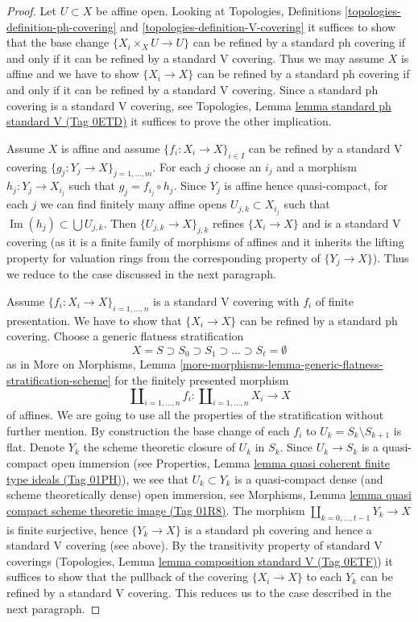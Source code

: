 \documentclass{amsart}
\theoremstyle{plain}
\theoremstyle{definition}
\theoremstyle{remark}
\numberwithin{equation}{subsection}
\def\Im{\mathop{\mathrm{Im}}}
\begin{document}
\begin{proof}
Let $U \subset X$ be affine open. Looking at
Topologies, Definitions \ref{topologies-definition-ph-covering}
and \ref{topologies-definition-V-covering} it suffices to show that
the base change $\{X_i \times_X U \to U\}$ can be refined
by a standard ph covering if and only if it can be refined by
a standard V covering. Thus we may assume $X$ is affine and we have to show
$\{X_i \to X\}$ can be refined by a standard ph covering
if and only if it can be refined by a standard V covering.
Since a standard ph covering is a standard V covering, see
Topologies, Lemma \href{https://stacks.math.columbia.edu/tag/0ETD}{lemma standard ph standard V (Tag 0ETD)}
it suffices to prove the other implication.

\medskip\noindent
Assume $X$ is affine and assume $\{f_i : X_i \to X\}_{i \in I}$
can be refined by a standard V covering
$\{g_j : Y_j \to X\}_{j = 1, \ldots, m}$.
For each $j$ choose an $i_j$ and a morphism
$h_j : Y_j \to X_{i_j}$ such that $g_j = f_{i_j} \circ h_j$.
Since $Y_j$ is affine hence quasi-compact,
for each $j$ we can find finitely many affine opens
$U_{j, k} \subset X_{i_j}$ such that $\Im(h_j) \subset \bigcup U_{j, k}$.
Then $\{U_{j, k} \to X\}_{j, k}$ refines $\{X_i \to X\}$
and is a standard V covering (as it is a finite family of morphisms
of affines and it inherits the lifting property for valuation rings
from the corresponding property of $\{Y_j \to X\}$).
Thus we reduce to the case discussed in the next paragraph.

\medskip\noindent
Assume $\{f_i : X_i \to X\}_{i = 1, \ldots, n}$
is a standard V covering with $f_i$ of finite presentation.
We have to show that $\{X_i \to X\}$ can be refined by a standard ph covering.
Choose a generic flatness stratification
$$
X = S \supset S_0 \supset S_1 \supset \ldots \supset S_t = \emptyset
$$
as in More on Morphisms, Lemma
\ref{more-morphisms-lemma-generic-flatness-stratification-scheme}
for the finitely presented morphism
$$
\coprod\nolimits_{i = 1, \ldots, n} f_i :
\coprod\nolimits_{i = 1, \ldots, n} X_i
\longrightarrow
X
$$
of affines. We are going to use all the properties of the stratification
without further mention. By construction the base change of each $f_i$ to
$U_k = S_k \setminus S_{k + 1}$ is flat.
Denote $Y_k$ the scheme theoretic closure of $U_k$ in $S_k$. Since
$U_k \to S_k$ is a quasi-compact open immersion (see
Properties, Lemma \href{https://stacks.math.columbia.edu/tag/01PH}{lemma quasi coherent finite type ideals (Tag 01PH)}),
we see that $U_k \subset Y_k$ is a quasi-compact dense
(and scheme theoretically dense) open immersion, see
Morphisms, Lemma \href{https://stacks.math.columbia.edu/tag/01R8}{lemma quasi compact scheme theoretic image (Tag 01R8)}.
The morphism $\coprod_{k = 0, \ldots, t - 1} Y_k \to X$
is finite surjective, hence $\{Y_k \to X\}$ is a standard ph covering
and hence a standard V covering (see above). By the transitivity
property of standard V coverings
(Topologies, Lemma \href{https://stacks.math.columbia.edu/tag/0ETF}{lemma composition standard V (Tag 0ETF)})
it suffices to show that the pullback of
the covering $\{X_i \to X\}$ to each $Y_k$ can be refined by a
standard V covering. This reduces us to the case described in the
next paragraph.


\end{proof}
\end{document}
